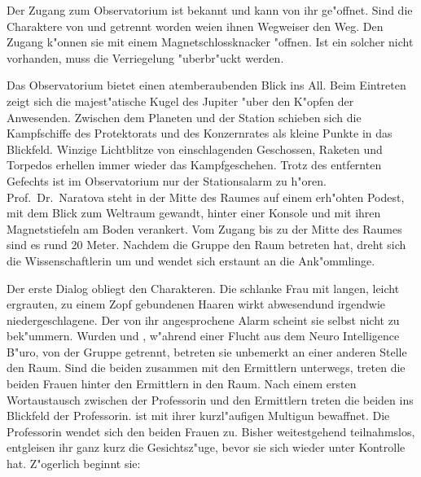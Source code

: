 
Der Zugang zum Observatorium ist \ml{} bekannt und kann von ihr ge"offnet. Sind die Charaktere von \xl{} und \ml{} getrennt worden wei\3en ihnen Wegweiser den Weg. Den Zugang k"onnen sie mit einem Magnetschlossknacker "offnen. Ist ein solcher nicht vorhanden, muss die Verriegelung "uberbr"uckt werden.

Das Observatorium bietet einen atemberaubenden Blick ins All. Beim Eintreten zeigt sich die majest"atische Kugel des Jupiter "uber den K"opfen der Anwesenden. Zwischen dem Planeten und der Station schieben sich die Kampfschiffe des Protektorats und des Konzernrates als kleine Punkte in das Blickfeld. Winzige Lichtblitze von einschlagenden Geschossen, Raketen und Torpedos erhellen immer wieder das Kampfgeschehen. Trotz des entfernten Gefechts ist im Observatorium nur der Stationsalarm zu h"oren. Prof.~Dr.~Naratova steht in der Mitte des Raumes auf einem erh"ohten Podest, mit dem Blick zum Weltraum gewandt, hinter einer Konsole und mit ihren Magnetstiefeln am Boden verankert. Vom Zugang bis zu der Mitte des Raumes sind es rund 20 Meter. Nachdem die Gruppe den Raum betreten hat, dreht sich die Wissenschaftlerin um und wendet sich erstaunt an die Ank"ommlinge.


Der erste Dialog obliegt den Charakteren. Die schlanke Frau mit langen, leicht ergrauten, zu einem Zopf gebundenen Haaren wirkt abwesendund irgendwie niedergeschlagene. Der von ihr angesprochene Alarm scheint sie selbst nicht zu bek"ummern. Wurden \xl{} und \ml{}, w"ahrend einer Flucht aus dem Neuro Intelligence B"uro, von der Gruppe getrennt, betreten sie unbemerkt an einer anderen Stelle den Raum. Sind die beiden zusammen mit den Ermittlern unterwegs, treten die beiden Frauen hinter den Ermittlern in den Raum. Nach einem ersten Wortaustausch zwischen der Professorin und den Ermittlern treten die beiden ins Blickfeld der Professorin. \xl{} ist mit ihrer kurzl"aufigen Multigun bewaffnet. Die Professorin wendet sich den beiden Frauen zu. Bisher weitestgehend teilnahmslos, entgleisen ihr ganz kurz die Gesichtsz"uge, bevor sie sich wieder unter Kontrolle hat. Z"ogerlich beginnt sie:


